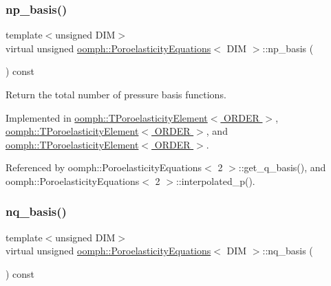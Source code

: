 \subsubsection{\texorpdfstring{np\+\_\+basis()}{np\_basis()}}
{\footnotesize\ttfamily template$<$unsigned D\+IM$>$ \\
virtual unsigned \hyperlink{classoomph_1_1PoroelasticityEquations}{oomph\+::\+Poroelasticity\+Equations}$<$ D\+IM $>$\+::np\+\_\+basis (\begin{DoxyParamCaption}{ }\end{DoxyParamCaption}) const\hspace{0.3cm}{\ttfamily [pure virtual]}}



Return the total number of pressure basis functions. 



Implemented in \hyperlink{classoomph_1_1TPoroelasticityElement_a5857ac5848d232bfc8b9ae84dde851fe}{oomph\+::\+T\+Poroelasticity\+Element$<$ O\+R\+D\+E\+R $>$}, \hyperlink{classoomph_1_1TPoroelasticityElement_a380340d846ca1c8982adef1085209d1b}{oomph\+::\+T\+Poroelasticity\+Element$<$ O\+R\+D\+E\+R $>$}, and \hyperlink{classoomph_1_1TPoroelasticityElement_a3befd892c66029500db46a8410f6e34e}{oomph\+::\+T\+Poroelasticity\+Element$<$ O\+R\+D\+E\+R $>$}.



Referenced by oomph\+::\+Poroelasticity\+Equations$<$ 2 $>$\+::get\+\_\+q\+\_\+basis(), and oomph\+::\+Poroelasticity\+Equations$<$ 2 $>$\+::interpolated\+\_\+p().

\mbox{\label{classoomph_1_1PoroelasticityEquations_aec90144cc61d817c97bee414e90921af}} 
\subsubsection{\texorpdfstring{nq\+\_\+basis()}{nq\_basis()}}
{\footnotesize\ttfamily template$<$unsigned D\+IM$>$ \\
virtual unsigned \hyperlink{classoomph_1_1PoroelasticityEquations}{oomph\+::\+Poroelasticity\+Equations}$<$ D\+IM $>$\+::nq\+\_\+basis (\begin{DoxyParamCaption}{ }\end{DoxyParamCaption}) const\hspace{0.3cm}{\ttfamily [pure virtual]}}



